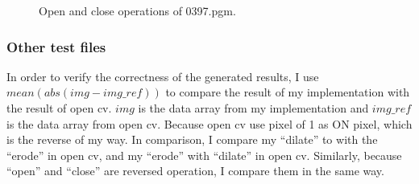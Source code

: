 \documentclass[paper=a4, fontsize=11pt]{scrartcl}
\numberwithin{equation}{section}		%
\numberwithin{figure}{section}			%
\numberwithin{table}{section}				%
\begin{document}
\begin{figure}[h]
\centering
{}
\caption{Open and close operations of 0397.pgm.}\label{fig:morph:01}
\end{figure}

\subsubsection{Other test files}

In order to verify the correctness of the generated results, I use $ mean( abs( img - img\_ref ) ) $ to compare the result of my implementation with the result of open cv.
$ img $ is the data array from my implementation and $ img\_ref $ is the data array from open cv.
Because open cv use pixel of 1 as ON pixel, which is the reverse of my way.
In comparison, I compare my ``dilate'' to with the ``erode'' in open cv, and my ``erode'' with ``dilate'' in open cv.
Similarly, because ``open'' and ``close'' are reversed operation, I compare them in the same way. 
\end{document}
